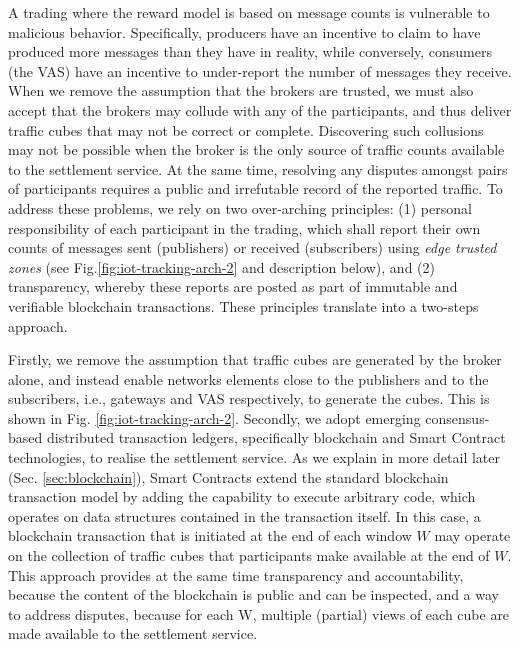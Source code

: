 \documentclass[chi_draft]{sigchi}
\begin{document}
A trading where the reward model is based on message counts is vulnerable to malicious behavior.
Specifically, producers have an incentive to claim to have produced more messages than they have in reality, while conversely, consumers (the VAS) have an incentive to under-report the number of messages they receive.
%
When we remove the assumption that the brokers are trusted, we must also accept that the brokers may collude with any of the participants, and thus deliver traffic cubes that may not be correct or complete.
Discovering such collusions may not be possible when the broker is the only source of traffic counts available to the settlement service.  At the same time, resolving any disputes amongst pairs of participants requires a public and irrefutable record of the reported traffic.
%
To address these problems, we rely on two over-arching principles: (1) personal responsibility of each participant in the trading, which shall report their own counts of messages sent (publishers) or received (subscribers) using \textit{edge trusted zones} (see Fig.\ref{fig:iot-tracking-arch-2} and description below),
 and (2) transparency, whereby these reports are posted as part of immutable and verifiable blockchain transactions.
These principles translate into a two-steps approach.
%

Firstly, we remove the assumption that traffic cubes are generated by the broker alone, and instead enable networks elements close to the publishers and to the subscribers, i.e., gateways and VAS respectively, to generate the cubes. This is shown in Fig. \ref{fig:iot-tracking-arch-2}.
%
Secondly, we adopt emerging consensus-based distributed transaction ledgers, specifically blockchain and Smart Contract technologies, to realise the settlement service.
As we explain in more detail later (Sec. \ref{sec:blockchain}), Smart Contracts extend the standard blockchain transaction model by adding the capability to execute arbitrary code, which operates on data structures contained in the transaction itself. 
In this case, a blockchain transaction that is initiated at the end of each window $W$ may operate on the collection of traffic cubes that participants make available at the end of $W$.
This  approach provides at the same time transparency and accountability, because the content of the blockchain is public and can be inspected, and a way to address disputes, because for each W, multiple (partial) views of each cube are made available to the settlement service.
\end{document}
